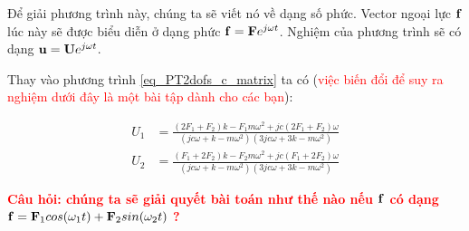 Để giải phương trình này, chúng ta sẽ viết nó về dạng số phức. Vector ngoại lực ${\bf f}$ lúc này sẽ được biểu diễn ở dạng phức ${\bf f} = {\bf F}e^{j\omega t}$. Nghiệm của phương trình sẽ có dạng ${\bf u} = {\bf U}e^{j\omega t}$.

Thay vào phương trình \cref{eq_PT2dofs_c_matrix} ta có (\textcolor{red}{việc biến đổi để suy ra nghiệm dưới đây là một bài tập dành cho các bạn}):

\begin{equation}\label{eq_nghiemphuc}
    \begin{aligned}
        {U}_1 &=\frac{\left(2 F_1+F_2\right) k-F_1 m \omega^2+j c\left(2 F_1+F_2\right) \omega}{\left(j c \omega+k-m \omega^2\right)\left(3 j c \omega+3 k-m \omega^2\right)}\\
        {U}_2 &=\frac{\left(F_1+2 F_2\right) k-F_2 m \omega^2+j c\left(F_1+2 F_2\right) \omega}{\left(j c \omega+k-m \omega^2\right)\left(3 j c \omega+3 k-m \omega^2\right)}
    \end{aligned}
\end{equation}

\textbf{\textcolor{red}{Câu hỏi: chúng ta sẽ giải quyết bài toán như thế nào nếu ${\bf f}$ có dạng ${\bf f} = {\bf F}_1cos(\omega_1t) + {\bf F}_2sin(\omega_2t)$ ?}}


